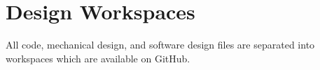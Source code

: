 \chapter{Design Workspaces}

All code, mechanical design, and software design files are separated into workspaces which are available on GitHub.